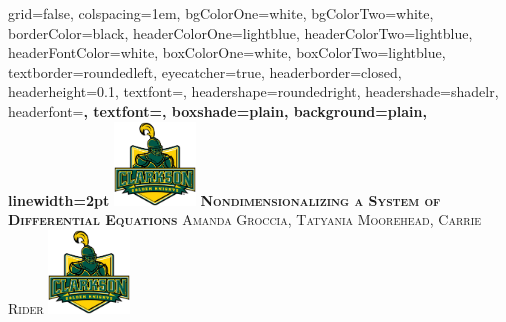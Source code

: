 \documentclass[landscape,final,a0paper,fontscale=0.285]{baposter}
\begin{document}


\begin{poster}%
  {
  grid=false,
  colspacing=1em,
  bgColorOne=white,
  bgColorTwo=white,
  borderColor=black,
  headerColorOne=lightblue,
  headerColorTwo=lightblue,
  headerFontColor=white,
  boxColorOne=white,
  boxColorTwo=lightblue,
  textborder=roundedleft,
  eyecatcher=true,
  headerborder=closed,
  headerheight=0.1\textheight,
  textfont=\sc, %
  headershape=roundedright,
  headershade=shadelr,
  headerfont=\Large\bf\textsc, %
  textfont={\setlength{\parindent}{1.5em}},
  boxshade=plain,
  background=plain,
  linewidth=2pt
  }
  {\includegraphics[height=6em]{img/Clarkson}} 
  {\bf\textsc{Nondimensionalizing a System of Differential Equations}\vspace{0.5em}}
  {\textsc{Amanda Groccia, Tatyania Moorehead, Carrie Rider}}
  {%
\includegraphics[height=6.0em]{img/Clarkson}
  }



\end{poster}
\end{document}
